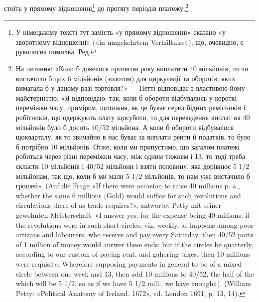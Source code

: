 стоїть у прямому відношенні\footnote*{
У німецькому тексті тут замість «у прямому відношенні» сказано
«у зворотному відношенні» («in umgekehrtem Verhältniss»), що, очевидно,
є рукописна помилка. Ред.
} до протягу періодів платежу.\footnote{
На питання: «Коли б довелося протягом року виплатити 40 мільйонів,
то чи вистачило б цих 6 мільйонів (золотом) для циркуляції та оборотів,
яких вимагала б у даному разі торговля?» — Петті відповідає з
властивою йому майстерністю: «Я відповідаю: так; коли б обороти відбувались
у короткі переміжки часу, приміром, щотижня, як це буває
серед бідних ремісників і робітників, що одержують плату щосуботи, то
для переведення виплат на 40 мільйонів було б досить 40/52 мільйона.
А коли б обороти відбувалися щокварталу, як то звичайно в нас буває
за виплати ренти й податків, то було б потрібно 10 мільйонів. Отже, коли
ми припустимо, що загалом платежі робиться через різні переміжки часу,
між одним тижнем і 13, то тоді треба скласти 10 мільйонів і 40/52 мільйони
і взяти половину, яка дорівнює 5 1/2 мільйонам, так що, коли б ми мали
5 1/2 мільйонів, то нам уже вистачило б грошей». (Auf die Frage «If there were
occasion to raise 40 millions p. a., whether the same 6 millions (Gold) would
suffice for such revolutions and circulations there of as trade requires?», antwortet
Petty mit seiner gewohnten Meisterschaft: «I answer yes: for the expense
being 40 millions, if the revolutions were in such short circles, viz, weekly,
as happens among poor artizans and labourers, who receive and pay every
Saturday, then 40/52 parts of 1 million of money would answer these ends;
but if the circles be quarterly, according to our custom of paying rent, and
gahering taxes, then 10 millions were requisite. Wherefore supposing payments
in general to be of a mixed circle between one week and 13, then add
10 millions to 40/52, the half of the which will be 5 1/2, so as if we have
5 1/2 mill., we have enough»). (William Petty: «Political Anatomy of Ireland.
1672», ed. London 1691, p. 13, 14).
}

